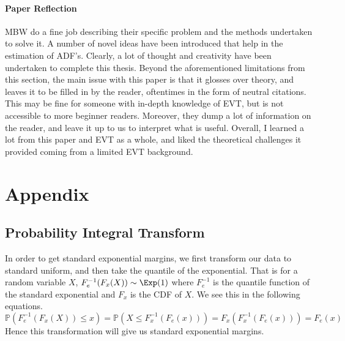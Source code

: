 \documentclass[12pt]{article}
\begin{document}
    \paragraph{Paper Reflection} MBW do a fine job describing their specific problem and the methods undertaken to solve it. 
    A number of novel ideas have been introduced that help in the estimation of ADF's.
    Clearly, a lot of thought and creativity have been undertaken to complete this thesis.
    Beyond the aforementioned limitations from this section, the main issue with this paper is that it glosses over theory, and leaves it to be filled in by the reader, oftentimes in the form of neutral citations.
    This may be fine for someone with in-depth knowledge of EVT, but is not accessible to more beginner readers.
    Moreover, they dump a lot of information on the reader, and leave it up to us to interpret what is useful. Overall, I learned a lot from this paper and EVT as a whole, and liked the theoretical challenges it provided coming from a limited EVT background.




\newpage




\newpage

\section{Appendix}

  \subsection{Probability Integral Transform} \label{app: pit}
    In order to get standard exponential margins, we first transform our data to standard uniform, and then take the quantile of the exponential. That is for a random variable $X$, $F_e^{-1}(F_x(X)) \sim \Exp(1)$ where $F_e^{-1}$ is the quantile function of the standard exponential and $F_x$ is the CDF of $X$. We see this in the following equations.
    \begin{equation}
      \mathbb{P}(F_e^{-1}(F_x(X)) \leq x) = \mathbb{P}(X \leq F_x^{-1}(F_e(x))) = F_x(F_x^{-1}(F_e(x))) = F_e(x)
    \end{equation}
    Hence this transformation will give us standard exponential margins.
\end{document}
